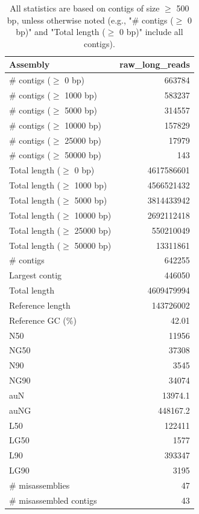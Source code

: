 \documentclass[12pt,a4paper]{article}
\begin{document}
\begin{table}[ht]
\begin{center}
\caption{All statistics are based on contigs of size $\geq$ 500 bp, unless otherwise noted (e.g., "\# contigs ($\geq$ 0 bp)" and "Total length ($\geq$ 0 bp)" include all contigs).}
\begin{tabular}{|l*{1}{|r}|}
\hline
Assembly & raw\_long\_reads \\ \hline
\# contigs ($\geq$ 0 bp) & 663784 \\ \hline
\# contigs ($\geq$ 1000 bp) & 583237 \\ \hline
\# contigs ($\geq$ 5000 bp) & 314557 \\ \hline
\# contigs ($\geq$ 10000 bp) & 157829 \\ \hline
\# contigs ($\geq$ 25000 bp) & 17979 \\ \hline
\# contigs ($\geq$ 50000 bp) & 143 \\ \hline
Total length ($\geq$ 0 bp) & 4617586601 \\ \hline
Total length ($\geq$ 1000 bp) & 4566521432 \\ \hline
Total length ($\geq$ 5000 bp) & 3814433942 \\ \hline
Total length ($\geq$ 10000 bp) & 2692112418 \\ \hline
Total length ($\geq$ 25000 bp) & 550210049 \\ \hline
Total length ($\geq$ 50000 bp) & 13311861 \\ \hline
\# contigs & 642255 \\ \hline
Largest contig & 446050 \\ \hline
Total length & 4609479994 \\ \hline
Reference length & 143726002 \\ \hline
Reference GC (\%) & 42.01 \\ \hline
N50 & 11956 \\ \hline
NG50 & 37308 \\ \hline
N90 & 3545 \\ \hline
NG90 & 34074 \\ \hline
auN & 13974.1 \\ \hline
auNG & 448167.2 \\ \hline
L50 & 122411 \\ \hline
LG50 & 1577 \\ \hline
L90 & 393347 \\ \hline
LG90 & 3195 \\ \hline
\# misassemblies & 47 \\ \hline
\# misassembled contigs & 43 \\ \hline

\end{tabular}
\end{center}
\end{table}
\end{document}
